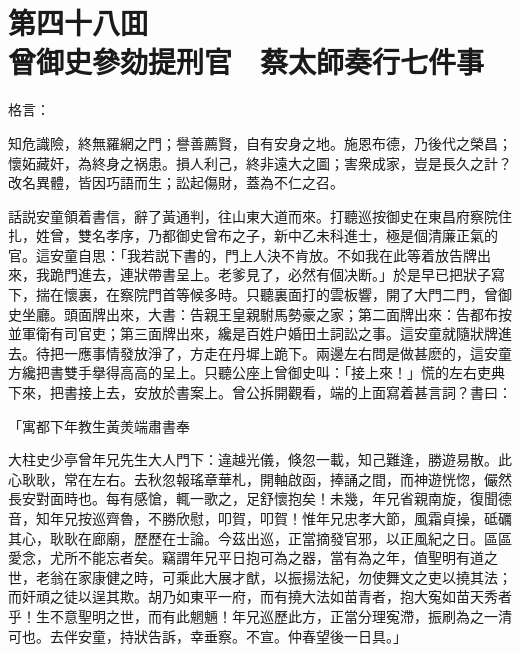 
\chapter*{第四十八囬　\\曾御史參劾提刑官　蔡太師奏行七件事}


格言：

\begin{myquote}
知危識險，終無羅網之門；譽善薦賢，自有安身之地。施恩布德，乃後代之榮昌；懷妬藏奸，為終身之祸患。損人利己，終非遠大之圖；害衆成家，豈是長久之計？改名異體，皆因巧語而生；訟起傷財，蓋為不仁之召。
\end{myquote}

話説安童領着書信，辭了黃通判，往山東大道而來。打聽巡按御史在東昌府察院住扎，姓曾，雙名孝序，乃都御史曾布之子，新中乙未科進士，極是個清廉正氣的官。這安童自思：「我若説下書的，門上人決不肯放。不如我在此等着放告牌出來，我跪門進去，連狀帶書呈上。老爹見了，必然有個决断。」於是早已把狀子寫下，揣在懷裏，在察院門首等候多時。只聽裏面打的雲板響，開了大門二門，曾御史坐廳。頭面牌出來，大書：告親王皇親駙馬勢豪之家；第二面牌出來：告都布按並軍衛有司官吏；第三面牌出來，纔是百姓户婚田土詞訟之事。這安童就隨狀牌進去。待把一應事情發放淨了，方走在丹墀上跪下。兩邊左右問是做甚麽的，這安童方纔把書雙手擧得高高的呈上。只聽公座上曾御史叫：「接上來！」慌的左右吏典下來，把書接上去，安放於書案上。曾公拆開觀看，端的上面寫着甚言詞？書曰：

\begin{myquote}[\markfont]
\hspace*{2em}「寓都下年教生黃羙端肅書奉

大柱史少亭曾年兄先生大人門下：違越光儀，倏忽一載，知己難逢，勝遊易散。此心耿耿，常在左右。去秋忽報瑤章華札，開軸啟函，捧誦之間，而神遊恍惚，儼然長安對面時也。每有感愴，輒一歌之，足舒懷抱矣！未幾，年兄省親南旋，復聞德音，知年兄按巡齊魯，不勝欣慰，叩賀，叩賀！惟年兄忠孝大節，風霜貞操，砥礪其心，耿耿在廊廟，歷歷在士論。今茲出巡，正當摘發官邪，以正風紀之日。區區愛念，尤所不能忘者矣。竊謂年兄平日抱可為之器，當有為之年，值聖明有道之世，老翁在家康健之時，可乘此大展才猷，以振揚法紀，勿使舞文之吏以撓其法；而奸頑之徒以逞其欺。胡乃如東平一府，而有撓大法如苗青者，抱大寃如苗天秀者乎！生不意聖明之世，而有此魍魎！年兄巡歷此方，正當分理寃滯，振刷為之一清可也。去伴安童，持狀告訴，幸垂察。不宣。仲春望後一日具。」
\end{myquote}

